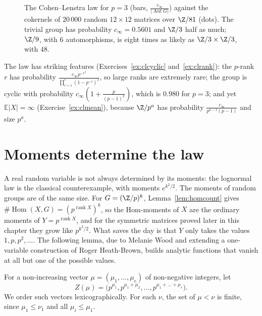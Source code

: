 \begin{figure}[ht]
\centering{}
\caption{The Cohen--Lenstra law for $p=3$ (bars, $\frac{c_\infty}{|\operatorname{Aut}G|}$) against the cokernels of $20\,000$ random $12\times12$ matrices over $\Z/81$ (dots). The trivial group has probability $c_\infty=0.5601$ and $\Z/3$ half as much; $\Z/9$, with $6$ automorphisms, is eight times as likely as $\Z/3\times\Z/3$, with $48$.}
\label{fig:cokernels}
\end{figure}

The law has striking features (Exercises~\ref{ex:clcyclic} and~\ref{ex:clrank}): the $p$-rank $r$ has probability $\frac{c_\infty p^{-r^2}}{\prod_{i=1}^r(1-p^{-i})^2}$, so large ranks are extremely rare; the group is cyclic with probability $c_\infty(1+\frac p{(p-1)^2})$, which is $0.980$ for $p=3$; and yet $\mathbb E|X|=\infty$ (Exercise~\ref{ex:clmean}), because $\Z/p^a$ has probability $\frac{c_\infty}{p^{a-1}(p-1)}$ and size $p^a$.

\section{Moments determine the law}

A real random variable is not always determined by its moments: the lognormal law is the classical counterexample, with moments $e^{k^2/2}$. The moments of random groups are of the same size. For $G=(\Z/p)^k$, Lemma~\ref{lem:homcount} gives $\#\operatorname{Hom}(X,G)=(p^{\operatorname{rank}X})^k$, so the Hom-moments of $X$ are the ordinary moments of $Y=p^{\operatorname{rank}X}$, and for the symmetric matrices proved later in this chapter they grow like $p^{k^2/2}$. What saves the day is that $Y$ only takes the values $1,p,p^2,\dots$. The following lemma, due to Melanie Wood and extending a one-variable construction of Roger Heath-Brown, builds analytic functions that vanish at all but one of the possible values.

For a non-increasing vector $\mu=(\mu_1,\dots,\mu_e)$ of non-negative integers, let\[Z(\mu)=\bigl(p^{\mu_1},p^{\mu_1+\mu_2},\dots,p^{\mu_1+\dots+\mu_e}\bigr).\] We order such vectors lexicographically. For each $\nu$, the set of $\mu<\nu$ is finite, since $\mu_1\le\nu_1$ and all $\mu_i\le\mu_1$.

